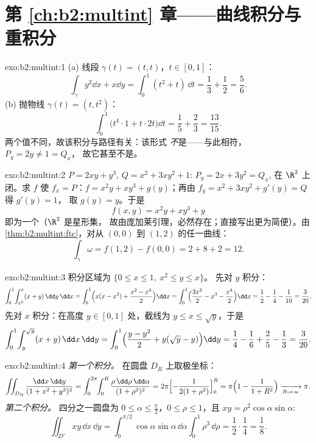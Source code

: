 \section*{第 \ref{ch:b2:multint} 章——曲线积分与重积分}

\begin{solution}{exo:b2:multint:1}
(a) 线段 $\gamma(t) = (t, t)$，$t \in [0,1]$：
\[
\int_\gamma y^2\dd x + x\dd y
= \int_0^1 (t^2 + t)\,\dd t = \frac13 + \frac12 = \frac56 .
\]
(b) 抛物线 $\gamma(t) = (t, t^2)$：
\[
\int_0^1 \bigl(t^4\cdot 1 + t\cdot 2t\bigr)\dd t
= \frac15 + \frac23 = \frac{13}{15} .
\]
两个值不同，故该积分与路径有关：该形式
\emph{不}是——与此相符，$P_y = 2y \neq 1 = Q_x$，
故它甚至不是。
\end{solution}

\begin{solution}{exo:b2:multint:2}
$P = 2xy + y^3$, $Q = x^2 + 3xy^2 + 1$: $P_y = 2x + 3y^2 = Q_x$,
在 $\R^2$ 上闭。求 $f$ 使 $f_x = P$：$f = x^2y + xy^3
+ g(y)$；再由 $f_y = x^2 + 3xy^2 + g'(y) = Q$ 得 $g'(y) = 1$，
取 $g(y) = y$。于是
\[
f(x, y) = x^2y + xy^3 + y
\]
即为一个（$\R^2$ 是星形集，
故由庞加莱引理，必然存在；直接写出更为简便）。由
\cref{thm:b2:multint:ftc}，对从 $(0,0)$ 到 $(1,2)$ 的任一曲线：
\[
\int_\gamma\omega = f(1, 2) - f(0, 0) = 2 + 8 + 2 = 12 .
\]
\end{solution}

\begin{solution}{exo:b2:multint:3}
积分区域为 $\{0 \leq x \leq 1,\ x^2 \leq y \leq x\}$。
先对 $y$ 积分：
\[
\int_0^1\!\int_{x^2}^{x}(x + y)\,\dd y\,\dd x
= \int_0^1\Bigl(x(x - x^2)
+ \frac{x^2 - x^4}{2}\Bigr)\dd x
= \int_0^1\Bigl(\frac{3x^2}{2} - x^3 - \frac{x^4}{2}\Bigr)\dd x
= \frac12 - \frac14 - \frac1{10} = \frac{3}{20} .
\]
先对 $x$ 积分：在高度 $y \in [0, 1]$ 处，截线为 $y \leq x \leq
\sqrt y$，于是
\[
\int_0^1\!\int_{y}^{\sqrt y}(x + y)\,\dd x\,\dd y
= \int_0^1\Bigl(\frac{y - y^2}{2}
+ y(\sqrt y - y)\Bigr)\dd y
= \frac14 - \frac16 + \frac25 - \frac13 = \frac{3}{20} .
\]
\end{solution}

\begin{solution}{exo:b2:multint:4}
\emph{第一个积分。} 在圆盘 $D_R$ 上取极坐标：
\[
\iint_{D_R}\frac{\dd x\,\dd y}{(1 + x^2 + y^2)^2}
= \int_0^{2\pi}\!\!\int_0^R
\frac{\rho\,\dd\rho\,\dd\alpha}{(1 + \rho^2)^2}
= 2\pi\Bigl[-\frac{1}{2(1 + \rho^2)}\Bigr]_0^R
= \pi\Bigl(1 - \frac{1}{1 + R^2}\Bigr)
\xrightarrow[R \to \infty]{} \pi .
\]
\emph{第二个积分。} 四分之一圆盘为 $0 \leq \alpha \leq
\frac\pi2$，$0 \leq \rho \leq 1$，且 $xy =
\rho^2\cos\alpha\sin\alpha$:
\[
\iint_{D'}xy\,\dd x\,\dd y
= \int_0^{\pi/2}\!\!\cos\alpha\sin\alpha\,\dd\alpha
\int_0^1 \rho^3\,\dd\rho
= \frac12\cdot\frac14 = \frac18 .
\]
\end{solution}

